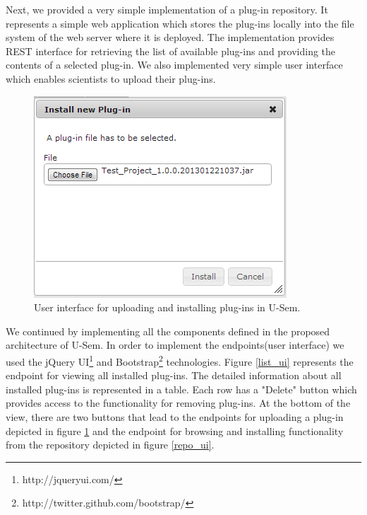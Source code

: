 Next, we provided a very simple implementation of a plug-in repository. It represents a simple web application which stores the plug-ins locally into the file system of the web server where it is deployed. The implementation provides REST interface for retrieving the list of available plug-ins and providing the contents of a selected plug-in. We also implemented very simple user interface which enables scientists to upload their plug-ins. 


\begin{figure}[h!]
  \centering
  	\includegraphics[scale=0.6]{plug-in/ui/upload.png}
  \caption{User interface for uploading and installing plug-ins in U-Sem.}
  \label{upload_ui}
\end{figure}

We continued by implementing all the components defined in the proposed architecture of U-Sem. In order to implement the endpoints(user interface) we used the jQuery UI\footnote{http://jqueryui.com/} and Bootstrap\footnote{http://twitter.github.com/bootstrap/} technologies. Figure \ref{list_ui} represents the endpoint for viewing all installed plug-ins. The detailed information about all installed plug-ins is represented in a table. Each row has a "Delete" button which provides access to the functionality for removing plug-ins. At the bottom of the view, there are two buttons that lead to the endpoints for uploading a plug-in depicted in figure \ref{upload_ui} and the endpoint for browsing and installing functionality from the repository depicted in figure \ref{repo_ui}.


